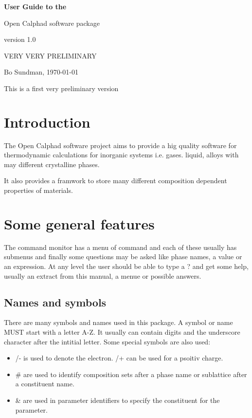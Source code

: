 \documentclass[12pt]{article}
\begin{document}
\begin{center}

{\Huge \bf User Guide to the 

Open Calphad software package

version 1.0

}

VERY VERY PRELIMINARY

Bo Sundman, \today

\end{center}

This is a first very preliminary version

\section{Introduction}

The Open Calphad software project aims to provide a hig quality
software for thermodynamic calculations for inorganic systems i.e.
gases. liquid, alloys with may different crystalline phases.

It also provides a framwork to store many different composition
dependent properties of materials.

\section{Some general features}

The command monitor has a menu of command and each of these usually
has submenus and finally some questions may be asked like phase names,
a value or an expression.  At any level the user should be able to
type a ? and get some help, usually an extract from this manual, a
menue or possible answers.

\subsection{Names and symbols}

There are many symbols and names used in this package.  A symbol or
name MUST start with a letter A-Z.  It usually can contain digits and
the underscore character after the intitial letter.  Some special
symbols are also used:

\begin{itemize}
\item /- is used to denote the electron. /+ can be used for a psoitiv charge.
\item \# are used to identify composition sets after a phase name or
sublattice after a constituent name.
\item \& are used in parameter identifiers to specify the constituent
for the parameter.
\end{itemize}
\end{document}
